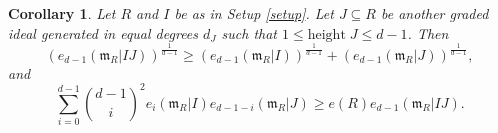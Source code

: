 \documentclass[12pt,a4paper]{amsart}
\theoremstyle{plain}
\newtheorem{corollary}[theorem]{Corollary}
\theoremstyle{definition}
\numberwithin{equation}{theorem}
\begin{document}
\begin{corollary}\label{cor_rev}
Let $R$ and $I$ be as in Setup \ref{setup}. Let $J\subseteq R$ be another graded ideal generated in equal degrees $d_J$ such that $1\leq \mathrm{height}\;J\leq d-1$. Then
\begin{equation}\label{ineq0}
 {\left(e_{d-1}\left(\mathfrak{m}_R \vert IJ\right)\right)}^{\tfrac{1}{d-1}} \geq {\left(e_{d-1}\left(\mathfrak{m}_R \vert I\right)\right)}^{\tfrac{1}{d-1}} + {\left(e_{d-1}\left(\mathfrak{m}_R \vert J\right)\right)}^{\tfrac{1}{d-1}},
\end{equation}
and
\begin{equation}\label{Khov_Teiss}
 \sum_{i=0}^{d-1} {\binom{d-1}{i}}^2 e_{i}\left(\mathfrak{m}_R \vert I\right) e_{d-1-i}\left(\mathfrak{m}_R \vert J\right) \geq e(R) e_{d-1}\left(\mathfrak{m}_R \vert IJ\right).
\end{equation}
\end{corollary}
\end{document}
